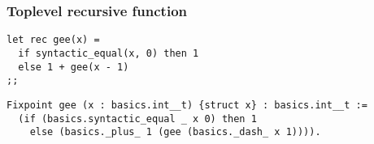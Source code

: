 \subsubsection{Toplevel recursive function}
{\footnotesize
\begin{lstlisting}
let rec gee(x) =
  if syntactic_equal(x, 0) then 1
  else 1 + gee(x - 1)
;;
\end{lstlisting}
}

{\footnotesize
\begin{lstlisting}[language=MyCoq]
Fixpoint gee (x : basics.int__t) {struct x} : basics.int__t :=
  (if (basics.syntactic_equal _ x 0) then 1
    else (basics._plus_ 1 (gee (basics._dash_ x 1)))).
\end{lstlisting}
}

